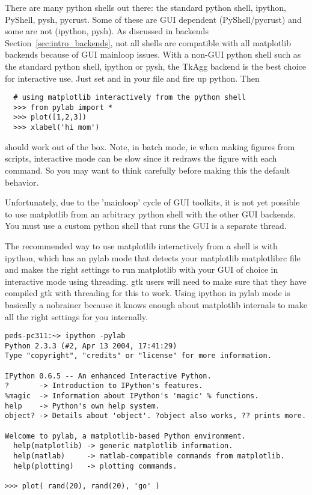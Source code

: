 \documentclass[twoside]{book}
\begin{document}
There are many python shells out there: the standard python shell,
ipython, PyShell, pysh, pycrust.  Some of these are GUI dependent
(PyShell/pycrust) and some are not (ipython, pysh).  As discussed in
backends Section~\ref{sec:intro_backends}, not all shells are compatible
with all matplotlib backends because of GUI mainloop issues.  With a
non-GUI python shell such as the standard python shell, ipython or
pysh, the TkAgg backend is the best choice for interactive use.  Just
set  and  in your
file and fire up python.  Then

\begin{lstlisting}
  # using matplotlib interactively from the python shell
  >>> from pylab import *
  >>> plot([1,2,3])
  >>> xlabel('hi mom')
\end{lstlisting}

\noindent should work out of the box.  Note, in batch mode, ie when making
figures from scripts, interactive mode can be slow since it redraws
the figure with each command.  So you may want to think carefully
before making this the default behavior.

Unfortunately, due to the 'mainloop' cycle of GUI toolkits, it is not
yet possible to use matplotlib from an arbitrary python shell with the
other GUI backends.  You must use a custom python shell that runs the
GUI is a separate thread.

The recommended way to use matplotlib interactively from a shell is
with ipython, which has an pylab
mode that detects your matplotlib matplotlibrc file and makes the right settings
to run matplotlib with your GUI of choice in interactive mode using
threading.  gtk users will need to make sure that they have compiled
gtk with threading for this to work.  Using ipython in pylab mode is
basically a nobrainer because it knows enough about matplotlib
internals to make all the right settings for you internally.

\begin{lstlisting}
peds-pc311:~> ipython -pylab
Python 2.3.3 (#2, Apr 13 2004, 17:41:29) 
Type "copyright", "credits" or "license" for more information.

IPython 0.6.5 -- An enhanced Interactive Python.
?       -> Introduction to IPython's features.
%magic  -> Information about IPython's 'magic' % functions.
help    -> Python's own help system.
object? -> Details about 'object'. ?object also works, ?? prints more.

Welcome to pylab, a matplotlib-based Python environment.
  help(matplotlib) -> generic matplotlib information.
  help(matlab)     -> matlab-compatible commands from matplotlib.
  help(plotting)   -> plotting commands.

>>> plot( rand(20), rand(20), 'go' )
\end{lstlisting}
\end{document}
